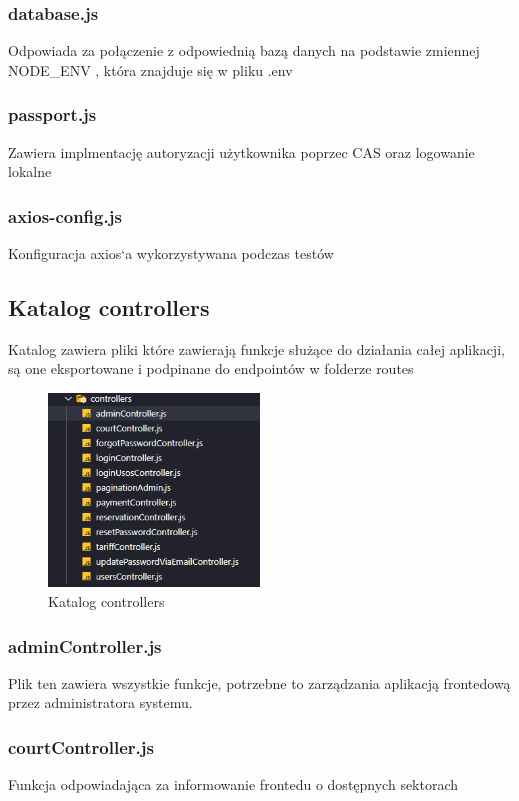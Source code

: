 \documentclass[titlepage]{article}
\begin{document}
\subsubsection{database.js}

Odpowiada za połączenie z odpowiednią bazą danych na podstawie zmiennej NODE\_ENV , która znajduje się w pliku .env  
\subsubsection{passport.js}
Zawiera implmentację  autoryzacji użytkownika poprzec CAS oraz logowanie lokalne

\subsubsection{axios-config.js}
Konfiguracja axios`a wykorzystywana podczas testów

\subsection{Katalog controllers}
Katalog zawiera pliki które zawierają funkcje służące do działania całej aplikacji, są one eksportowane i podpinane do endpointów w folderze routes

\begin{figure}[h]
\centering
\includegraphics[width=0.5\textwidth]{controllers.png}
\caption{Katalog controllers}
\label{fig:obrazek controllers}
\end{figure}

\subsubsection{adminController.js}
Plik ten zawiera wszystkie funkcje, potrzebne to zarządzania aplikacją frontedową przez administratora systemu. 

\subsubsection{courtController.js}
Funkcja odpowiadająca za informowanie frontedu o dostępnych sektorach
\end{document}
